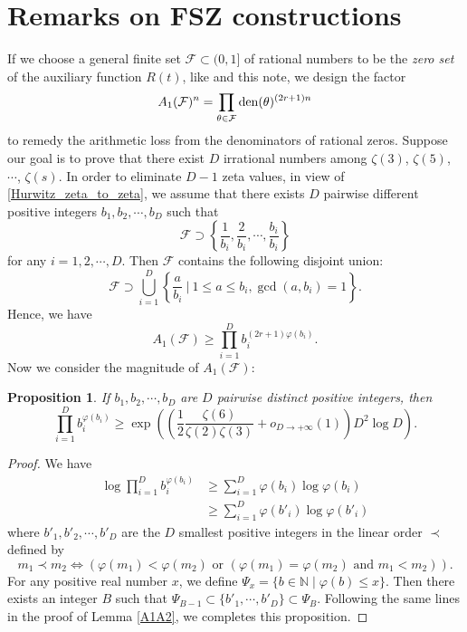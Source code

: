 \documentclass[11pt]{amsart}
\newtheorem{proposition}[theorem]{Proposition}
\numberwithin{equation}{section}
\begin{document}
\section{Remarks on FSZ constructions}
\label{Remarks}

If we choose a general finite set $\mathcal{F} \subset (0,1]$ of rational numbers to be the \emph{zero set} of the auxiliary function $R(t)$, like \cite{FSZ2019} and this note, we design the factor
\begin{equation}\label{A_1_F}
 A_1(\mathcal{F})^n =  \prod_{\theta \in \mathcal{F}} {\rm den}(\theta)^{(2r+1)n}
\end{equation}
to remedy the arithmetic loss from the denominators of rational zeros. Suppose our goal is to prove that there exist $D$ irrational numbers among $\zeta(3)$, $\zeta(5)$, $\cdots$, $\zeta(s)$. In order to eliminate $D-1$ zeta values, in view of \eqref{Hurwitz_zeta_to_zeta}, we assume that there exists $D$ pairwise different positive integers $b_1, b_2 , \cdots, b_D$ such that
\begin{equation}\label{F_can_elimanate_D_values}
 \mathcal{F} \supset \left\{ \frac{1}{b_i} ,\frac{2}{b_i} , \cdots, \frac{b_i}{b_i} \right\}
\end{equation}
for any $i=1,2,\cdots,D$. Then $\mathcal{F}$ contains the following disjoint union:
\[ \mathcal{F} \supset \bigcup_{i=1}^{D} \left\{ \frac{a}{b_i} ~\bigg|~ 1 \leq a \leq b_i, \gcd(a,b_i) = 1 \right\} .\]
Hence, we have
\[ A_1(\mathcal{F}) \geqslant \prod_{i=1}^{D} b_i^{(2r+1)\varphi(b_i)}. \]
Now we consider the magnitude of $A_1(\mathcal{F})$:

\smallskip
\begin{proposition}\label{A_1_F_geq}
If $b_1,b_2,\cdots,b_D$ are $D$ pairwise distinct positive integers, then
\[ \prod_{i=1}^{D} b_i^{\varphi(b_i)} \geqslant \exp\left( \left( \frac{1}{2}\frac{\zeta(6)}{\zeta(2)\zeta(3)} +o_{D \rightarrow +\infty}(1)\right) D^2\log D   \right) . \]
\end{proposition}
\begin{proof}
We have
\begin{align*}
\log \prod_{i=1}^{D} b_i^{\varphi(b_i)} &\geqslant \sum_{i=1}^{D} \varphi(b_i)\log \varphi(b_i) \\
&\geqslant \sum_{i=1}^{D} \varphi(b'_i)\log \varphi(b'_i)
\end{align*}
where $b'_1,b'_2,\cdots,b'_D$ are the $D$ smallest positive integers in the linear order $\prec $ defined by
\[m_1 \prec m_2 \Leftrightarrow \left(  \varphi(m_1)<\varphi(m_2) \text{~or~} \left( \varphi(m_1) = \varphi(m_2) \text{~and~} m_1 < m_2 \right) \right). \]
For any positive real number $x$, we define $\mathcal{\varPsi}_x =  \{ b \in \mathbb{N} \mid \varphi(b) \leqslant x \}$. Then there exists an integer $B$ such that $\mathcal{\varPsi}_{B-1} \subset \{ b'_1,\cdots,b'_D \} \subset \mathcal{\varPsi}_{B}$. Following the same lines in the proof of Lemma \ref{A1A2}, we completes this proposition.
\end{proof}
\smallskip
\end{document}
